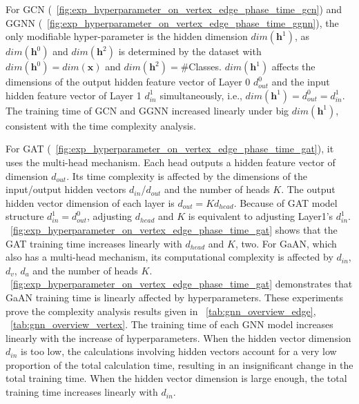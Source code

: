 For GCN (\figurename~\ref{fig:exp_hyperparameter_on_vertex_edge_phase_time_gcn}) and GGNN (\figurename~\ref{fig:exp_hyperparameter_on_vertex_edge_phase_time_ggnn}), the only modifiable hyper-parameter is the hidden dimension $dim(\boldsymbol{h}^1)$, as $dim(\boldsymbol{h}^0)$ and $dim(\boldsymbol{h}^2)$ is determined by the dataset with $dim(\boldsymbol{h}^0)=dim(\boldsymbol{x})$ and $dim(\boldsymbol{h}^2)=$\#Classes.
$dim(\boldsymbol{h}^1)$ affects the dimensions of the output hidden feature vector of Layer 0 $d^{0}_{out}$ and the input hidden feature vector of Layer 1 $d^1_{in}$ simultaneously, i.e., $dim(\boldsymbol{h}^1) = d^0_{out} = d^1_{in}$.
The training time of GCN and GGNN increased linearly under big $dim(\boldsymbol{h}^1)$, consistent with the time complexity analysis.

For GAT (\figurename~\ref{fig:exp_hyperparameter_on_vertex_edge_phase_time_gat}), it uses the multi-head mechanism.
Each head outputs a hidden feature vector of dimension $d_{out}$.
Its time complexity is affected by the dimensions of the input/output hidden vectors $d_{in}$/$d_{out}$ and the number of heads $K$.
The output hidden vector dimension of each layer is $d_{out}=K d_{head}$.
Because of GAT model structure $d^1_{in}=d^0_{out}$, adjusting $d_{head}$ and $K$ is equivalent to adjusting Layer1’s $d^1_{in}$.
\figurename~\ref{fig:exp_hyperparameter_on_vertex_edge_phase_time_gat} shows that the GAT training time increases linearly with $d_{head}$ and $K$, two.
For GaAN, which also has a multi-head mechanism, its computational complexity is affected by $d_{in}$, $d_v$, $d_a$ and the number of heads $K$.
\figurename~\ref{fig:exp_hyperparameter_on_vertex_edge_phase_time_gat} demonstrates that GaAN training time is linearly affected by hyperparameters.
These experiments prove the complexity analysis results given in \tablename~\ref{tab:gnn_overview_edge}, \tablename~\ref{tab:gnn_overview_vertex}.
The training time of each GNN model increases linearly with the increase of hyperparameters.
When the hidden vector dimension $d_{in}$ is too low, the calculations involving hidden vectors account for a very low proportion of the total calculation time,
resulting in an insignificant change in the total training time.
When the hidden vector dimension is large enough, the total training time increases linearly with $d_{in}$.


